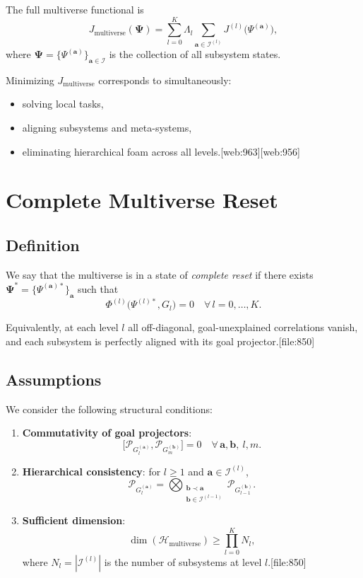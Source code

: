 \documentclass[12pt]{article}
\begin{document}
The full multiverse functional is
\[
J_{\text{multiverse}}(\bm{\Psi}) =
\sum_{l=0}^K \Lambda_l
\sum_{\bm{a} \in \mathcal{I}^{(l)}}
J^{(l)}\big(\Psi^{(\bm{a})}\big),
\]
where $\bm{\Psi} = \{\Psi^{(\bm{a})}\}_{\bm{a} \in \mathcal{I}}$ is the collection
of all subsystem states.

Minimizing $J_{\text{multiverse}}$ corresponds to simultaneously:
\begin{itemize}
  \item solving local tasks,
  \item aligning subsystems and meta-systems,
  \item eliminating hierarchical foam across all levels.[web:963][web:956]
\end{itemize}

\section{Complete Multiverse Reset}

\subsection{Definition}

We say that the multiverse is in a state of \emph{complete reset}
if there exists $\bm{\Psi}^* = \{\Psi^{(\bm{a})*}\}_{\bm{a}}$ such that
\[
\Phi^{(l)}\big(\Psi^{(l)*}, G_l\big) = 0
\quad \forall\, l = 0,\dots,K.
\]

Equivalently, at each level $l$ all off-diagonal, goal-unexplained
correlations vanish, and each subsystem is perfectly aligned
with its goal projector.[file:850]

\subsection{Assumptions}

We consider the following structural conditions:
\begin{enumerate}
  \item \textbf{Commutativity of goal projectors}:
    \[
    \big[
      \mathcal{P}_{G_l^{(\bm{a})}},
      \mathcal{P}_{G_m^{(\bm{b})}}
    \big] = 0
    \quad
    \forall\, \bm{a},\bm{b},\ l,m.
    \]
  \item \textbf{Hierarchical consistency}:
    for $l \ge 1$ and $\bm{a} \in \mathcal{I}^{(l)}$,
    \[
    \mathcal{P}_{G_l^{(\bm{a})}} =
    \bigotimes_{\substack{\bm{b} \prec \bm{a} \\
                          \bm{b} \in \mathcal{I}^{(l-1)}}}
    \mathcal{P}_{G_{l-1}^{(\bm{b})}}.
    \]
  \item \textbf{Sufficient dimension}:
    \[
    \dim(\mathcal{H}_{\text{multiverse}})
    \ge
    \prod_{l=0}^K N_l,
    \]
    where $N_l = |\mathcal{I}^{(l)}|$ is the number of subsystems at level $l$.[file:850]
\end{enumerate}
\end{document}
